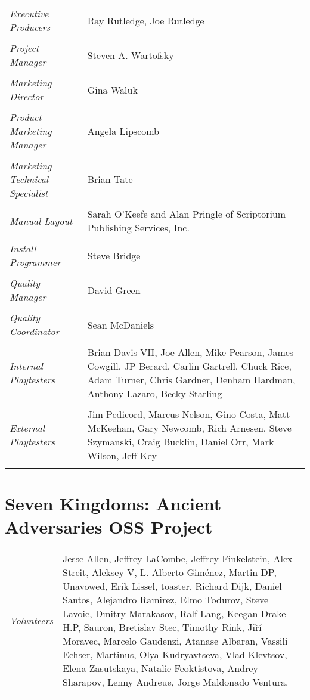 \begin{tabular}{p{1in} p{3in}}
    \textit{Executive Producers} & Ray Rutledge, Joe Rutledge \\ \\
    \textit{Project Manager} & Steven A. Wartofsky \\ \\
    \textit{Marketing Director} & Gina Waluk \\ \\
    \textit{Product Marketing Manager} & Angela Lipscomb \\ \\
    \textit{Marketing Technical Specialist}    & Brian Tate \\ \\
    \textit{Manual Layout} & Sarah O’Keefe and Alan Pringle of Scriptorium Publishing Services, Inc. \\ \\
    \textit{Install Programmer}    & Steve Bridge \\ \\
    \textit{Quality Manager} & David Green \\ \\
    \textit{Quality Coordinator} & Sean McDaniels \\ \\
    \textit{Internal Playtesters} & Brian Davis VII, Joe Allen, Mike Pearson, James Cowgill, JP Berard, Carlin Gartrell, Chuck Rice, Adam Turner, Chris Gardner, Denham Hardman, Anthony Lazaro, Becky Starling \\ \\
    \textit{External Playtesters} & Jim Pedicord, Marcus Nelson, Gino Costa, Matt McKeehan, Gary Newcomb, Rich Arnesen, Steve Szymanski, Craig Bucklin, Daniel Orr, Mark Wilson, Jeff Key \\ \\
\end{tabular}

\clearpage

\section{\textsf{Seven Kingdoms: Ancient Adversaries OSS Project}}

\begin{tabular}{p{1in} p{3in}}
    \textit{Volunteers} & Jesse Allen, Jeffrey LaCombe, Jeffrey Finkelstein, Alex Streit, Aleksey V, L. Alberto Giménez, Martin DP, Unavowed, Erik Lissel, toaster, Richard Dijk, Daniel Santos, Alejandro Ramirez, Elmo Todurov, Steve Lavoie, Dmitry Marakasov, Ralf Lang, Keegan Drake H.P, Sauron, Bretislav Stec, Timothy Rink, Ji\u{r}í Moravec, Marcelo Gaudenzi, Atanase Albaran, Vassili Echser, Martinus, Olya Kudryavtseva, Vlad Klevtsov, Elena Zasutskaya, Natalie Feoktistova, Andrey Sharapov, Lenny Andreue, Jorge Maldonado Ventura. \\ \\
\end{tabular}